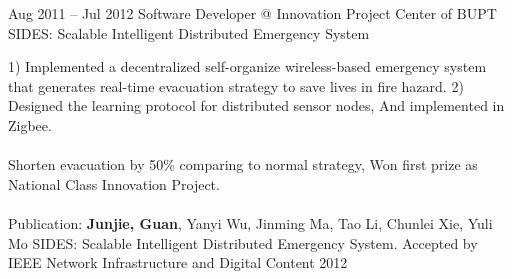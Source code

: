 \documentclass{tccv}
\begin{document}
\begin{eventlist}
     
     
     
     
     
     
    
    
    
    
    
    
    
    
    
    
    
    
    
    
    
   





\item{Aug 2011 -- Jul 2012}
     {Software Developer @ Innovation Project Center of BUPT}
     {SIDES: Scalable Intelligent Distributed Emergency System}
     
     1) Implemented a decentralized self-organize wireless-based emergency system that generates real-time evacuation strategy to save lives in fire hazard. 2) Designed the learning protocol for distributed sensor nodes, And implemented in Zigbee.
\\\\
Shorten evacuation by 50\% comparing to normal strategy, Won first prize as National Class Innovation Project.
\\\\
Publication: \textbf{Junjie, Guan}, Yanyi Wu, Jinming Ma, Tao Li, Chunlei Xie, Yuli Mo SIDES: Scalable Intelligent Distributed Emergency System. Accepted by IEEE Network Infrastructure and Digital Content 2012
     
\end{eventlist}
\end{document}
